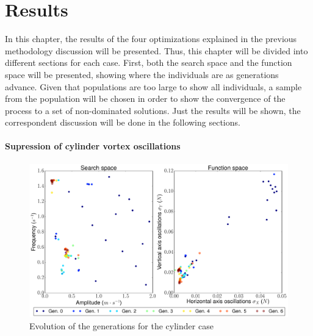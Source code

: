 \chapter{Results}

In this chapter, the results of the four optimizations explained in the previous methodology discussion will be presented. Thus, this chapter will be divided into different sections for each case. First, both the search space and the function space will be presented, showing where the individuals are as generations advance. Given that populations are too large to show all individuals, a sample from the population will be chosen in order to show the convergence of the process to a set of non-dominated solutions. Just the results will be shown, the correspondent discussion will be done in the following sections.

\newpage

\subsubsection*{Supression of cylinder vortex oscillations}

     \begin{figure}[h!]
        \centering
        \small
        \includegraphics[width=\textwidth, height=0.35\textheight]{Figures/4/gen6.pdf}
        \caption{Evolution of the generations for the cylinder case}
        \label{fig:genForCylinder}
    \end{figure}
    
